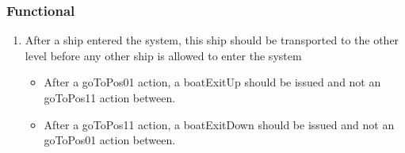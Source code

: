 \subsubsection*{Functional}
\begin{enumerate}
	\item After a ship entered the system, this ship should be transported to the other level before any other ship is allowed to enter the system
	\begin{itemize}
		\item After a goToPos01 action, a boatExitUp should be issued and not an goToPos11 action between.
		\item After a goToPos11 action, a boatExitDown should be issued and not an goToPos01 action between.
	\end{itemize}
\end{enumerate}